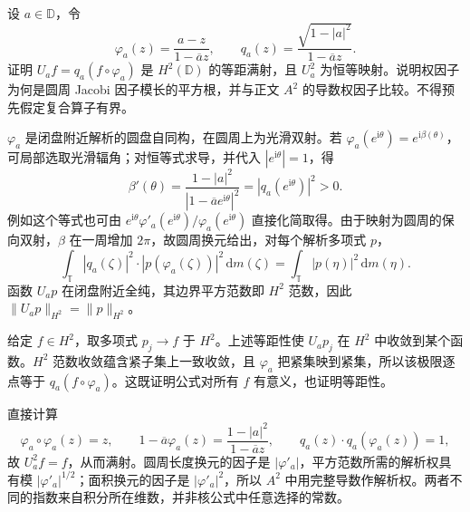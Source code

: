 \begin{optionalexercise}\label{b3:ex:28-8}
设 \(a\in\mathbb D\)，令
\[
 \varphi_a(z)=\frac{a-z}{1-\overline a z},\qquad
 q_a(z)=\frac{\sqrt{1-|a|^2}}{1-\overline a z}.
\]
证明 \(U_af=q_a(f\circ\varphi_a)\) 是 \(H^2(\mathbb D)\) 的等距满射，且 \(U_a^2\) 为恒等映射。说明权因子为何是圆周 Jacobi 因子模长的平方根，并与正文 \(A^2\) 的导数权因子比较。不得预先假定复合算子有界。
\end{optionalexercise}
\begin{solution}
\(\varphi_a\) 是闭盘附近解析的圆盘自同构，在圆周上为光滑双射。若 \(\varphi_a(e^{\mathrm i\theta})=e^{\mathrm i\beta(\theta)}\)，可局部选取光滑辐角；对恒等式求导，并代入 \(|e^{\mathrm i\theta}|=1\)，得
\[
 \beta'(\theta)=\frac{1-|a|^2}{|1-\overline a e^{\mathrm i\theta}|^2}
 =|q_a(e^{\mathrm i\theta})|^2>0.
\]
例如这个等式也可由 \(e^{\mathrm i\theta}\varphi'_a(e^{\mathrm i\theta})/\varphi_a(e^{\mathrm i\theta})\) 直接化简取得。由于映射为圆周的保向双射，\(\beta\) 在一周增加 \(2\pi\)，故圆周换元给出，对每个解析多项式 \(p\)，
\[
 \int_{\mathbb T}|q_a(\zeta)|^2\cdot|p(\varphi_a(\zeta))|^2\,\mathrm dm(\zeta)
 =\int_{\mathbb T}|p(\eta)|^2\,\mathrm dm(\eta).
\]
函数 \(U_ap\) 在闭盘附近全纯，其边界平方范数即 \(H^2\) 范数，因此 \(\|U_ap\|_{H^2}=\|p\|_{H^2}\)。

给定 \(f\in H^2\)，取多项式 \(p_j\to f\) 于 \(H^2\)。上述等距性使 \(U_ap_j\) 在 \(H^2\) 中收敛到某个函数。\(H^2\) 范数收敛蕴含紧子集上一致收敛，且 \(\varphi_a\) 把紧集映到紧集，所以该极限逐点等于 \(q_a(f\circ\varphi_a)\)。这既证明公式对所有 \(f\) 有意义，也证明等距性。

直接计算
\[
 \varphi_a\circ\varphi_a(z)=z,\qquad
 1-\overline a\varphi_a(z)=\frac{1-|a|^2}{1-\overline a z},
 \qquad q_a(z)\cdot q_a(\varphi_a(z))=1,
\]
故 \(U_a^2f=f\)，从而满射。圆周长度换元的因子是 \(|\varphi'_a|\)，平方范数所需的解析权具有模 \(|\varphi'_a|^{1/2}\)；面积换元的因子是 \(|\varphi'_a|^2\)，所以 \(A^2\) 中用完整导数作解析权。两者不同的指数来自积分所在维数，并非核公式中任意选择的常数。
\end{solution}
